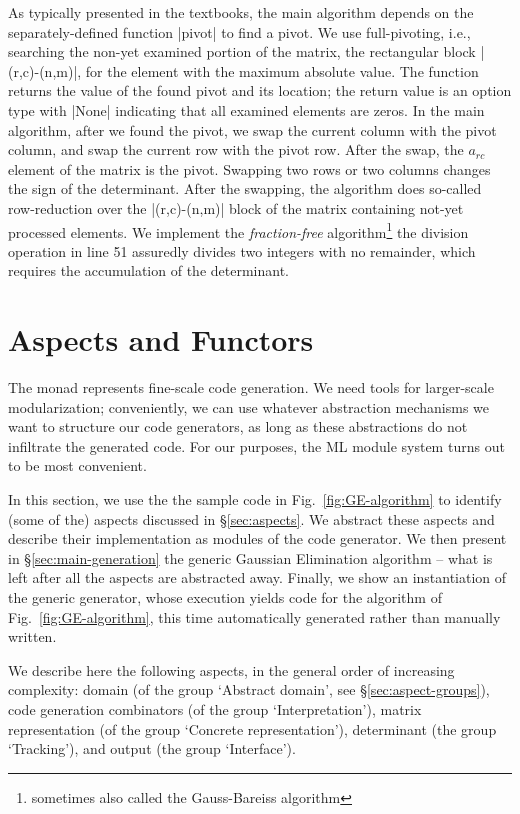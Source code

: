 \documentclass{elsart}
\begin{document}
As typically presented in the textbooks, the main algorithm depends on
the separately-defined function |pivot| to find a pivot. We use
full-pivoting, i.e., searching the non-yet examined portion of the matrix, 
the rectangular block |(r,c)-(n,m)|, for the element with the 
maximum absolute value. The function returns the value of the
found pivot and its location; the return value is an option type with
|None| indicating that all examined elements are zeros. In the main
algorithm, after we found the pivot, we swap the current column 
with the pivot column, and swap the current row with the pivot row. 
After the swap, the $a_{rc}$ element of the matrix is the pivot.
Swapping two rows or two columns changes the sign of the determinant.
After the swapping, the algorithm does so-called row-reduction
over the |(r,c)-(n,m)| block of the matrix containing not-yet
processed elements. We implement the \emph{fraction-free}
algorithm\footnote{sometimes also called the Gauss-Bareiss algorithm}
\cite{Bareiss68}
the division operation in line 51 assuredly divides two integers
with no remainder, which requires the accumulation
of the determinant.

\section{Aspects and Functors}\label{functors}

The monad represents fine-scale code generation. We need tools for
larger-scale modularization; conveniently, we can use whatever abstraction
mechanisms we want to structure our code generators, as long as these
abstractions do not infiltrate the generated code. For our purposes, the
ML module system turns out to be most convenient.

In this section, we use the the sample code in
Fig.~\ref{fig:GE-algorithm} to identify (some of the) aspects
discussed in \S\ref{sec:aspects}. We abstract these aspects and
describe their implementation as modules of the code generator.  We
then present in \S\ref{sec:main-generation} the generic Gaussian
Elimination algorithm -- what is left after all the aspects are
abstracted away. Finally, we show an instantiation of the generic
generator, whose execution yields code for the algorithm of
Fig.~\ref{fig:GE-algorithm}, this time automatically generated rather
than manually written.

We describe here the following aspects, in the general
order of increasing complexity: domain (of the group `Abstract
domain', see \S\ref{sec:aspect-groups}), code generation combinators
(of the group `Interpretation'), matrix representation (of the group
`Concrete representation'), determinant (the group `Tracking'), and
output (the group `Interface').
\end{document}
